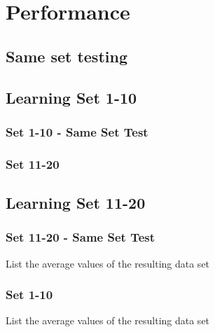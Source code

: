 \chapter{Performance}

\section{Same set testing}

\section{Learning Set 1-10}
\subsection{Set 1-10 - Same Set Test}


\subsection{Set 11-20}


\section{Learning Set 11-20}
\subsection{Set 11-20 - Same Set Test}
List the average values of the resulting data set

\subsection{Set 1-10}
List the average values of the resulting data set




